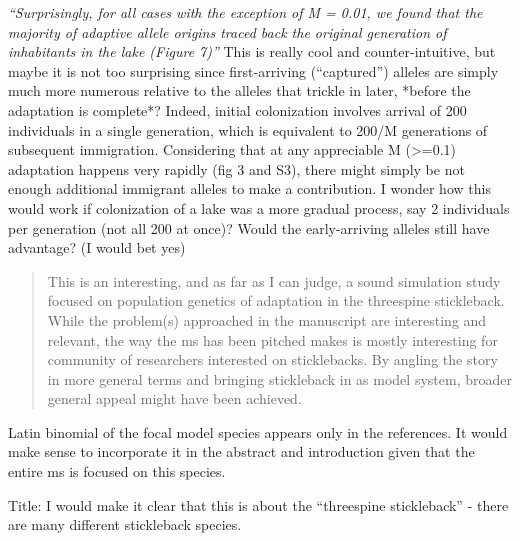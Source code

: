 \reply{
}

\begin{point}{}
    \textit{``Surprisingly, for all cases with the exception of M = 0.01, we found that the
    majority of adaptive allele origins traced back the original generation of
    inhabitants in the lake (Figure 7)''}
    This is really cool and counter-intuitive,
    but maybe it is not too surprising since first-arriving (``captured'') alleles
    are simply much more numerous relative to the alleles that trickle in later,
    *before the adaptation is complete*? Indeed, initial colonization involves
    arrival of 200 individuals in a single generation, which is equivalent to 200/M
    generations of subsequent immigration. Considering that at any appreciable M
    (>=0.1) adaptation happens very rapidly (fig 3 and S3), there might simply be
    not enough additional immigrant alleles to make a contribution. I wonder how
    this would work if colonization of a lake was a more gradual process, say 2
    individuals per generation (not all 200 at once)? Would the early-arriving
    alleles still have advantage? (I would bet yes)
\end{point}

\reply{
}




\begin{quote}
    This is an interesting, and as far as I can judge, a sound simulation study
    focused on population genetics of adaptation in the threespine stickleback.
    While the problem(s) approached in the manuscript are interesting and relevant,
    the way the ms has been pitched makes is mostly interesting for community of
    researchers interested on sticklebacks. By angling the story in more general
    terms and bringing stickleback in as model system, broader general appeal might
    have been achieved.
\end{quote}


\begin{point}{}
Latin binomial of the focal model species appears only in the references. It would make sense to incorporate it in the abstract and introduction given that the entire ms is focused on this species.
\end{point}


\begin{point}{Title:}
I would make it clear that this is about the ``threespine stickleback'' - there are many different stickleback species.
\end{point}

